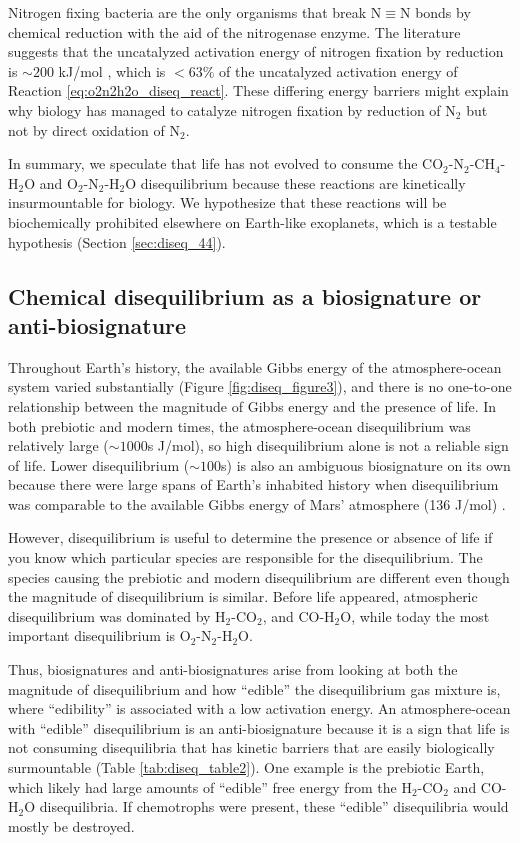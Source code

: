 Nitrogen fixing bacteria are the only organisms that break $\mathrm{N \equiv N}$ bonds by chemical reduction with the aid of the nitrogenase enzyme. The literature suggests that the uncatalyzed activation energy of nitrogen fixation by reduction is $\sim 200$ kJ/mol \citep{Hageman_1980}, which is $< 63\%$ of the uncatalyzed activation energy of Reaction \eqref{eq:o2n2h2o_diseq_react}. These differing energy barriers might explain why biology has managed to catalyze nitrogen fixation by reduction of N$_2$ but not by direct oxidation of N$_2$.

In summary, we speculate that life has not evolved to consume the CO$_2$-N$_2$-CH$_4$-H$_2$O and O$_2$-N$_2$-H$_2$O disequilibrium because these reactions are kinetically insurmountable for biology. We hypothesize that these reactions will be biochemically prohibited elsewhere on Earth-like exoplanets, which is a testable hypothesis (Section \ref{sec:diseq_44}).

\subsection{Chemical disequilibrium as a biosignature or anti-biosignature}

Throughout Earth's history, the available Gibbs energy of the atmosphere-ocean system varied substantially (Figure \ref{fig:diseq_figure3}), and there is no one-to-one relationship between the magnitude of Gibbs energy and the presence of life. In both prebiotic and modern times, the atmosphere-ocean disequilibrium was relatively large ($\sim 1000$s J/mol), so high disequilibrium alone is not a reliable sign of life. Lower disequilibrium ($\sim 100$s) is also an ambiguous biosignature on its own because there were large spans of Earth's inhabited history when disequilibrium was comparable to the available Gibbs energy of Mars' atmosphere (136 J/mol) \citep{KrissansenTotton_2016}.

However, disequilibrium is useful to determine the presence or absence of life if you know which particular species are responsible for the disequilibrium. The species causing the prebiotic and modern disequilibrium are different even though the magnitude of disequilibrium is similar. Before life appeared, atmospheric disequilibrium was dominated by H$_2$-CO$_2$, and CO-H$_2$O, while today the most important disequilibrium is O$_2$-N$_2$-H$_2$O. 

Thus, biosignatures and anti-biosignatures arise from looking at both the magnitude of disequilibrium and how ``edible'' the disequilibrium gas mixture is, where ``edibility'' is associated with a low activation energy. An atmosphere-ocean with ``edible'' disequilibrium is an anti-biosignature because it is a sign that life is not consuming disequilibria that has kinetic barriers that are easily biologically surmountable (Table \ref{tab:diseq_table2}). One example is the prebiotic Earth, which likely had large amounts of ``edible'' free energy from the H$_2$-CO$_2$ and CO-H$_2$O disequilibria. If chemotrophs were present, these ``edible'' disequilibria would mostly be destroyed.

